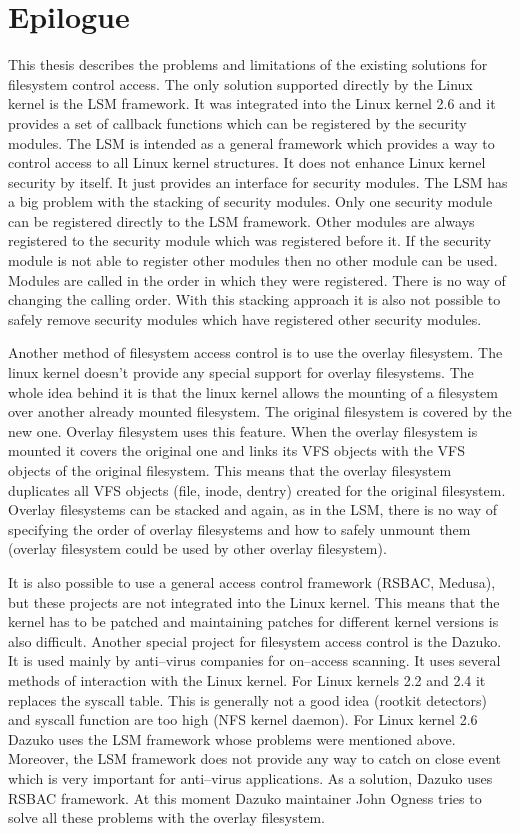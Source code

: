 \chapter{Epilogue}
This thesis describes the problems and limitations of the existing solutions for
filesystem control access. The only solution supported directly by the Linux kernel is
the LSM framework. It was integrated into the Linux kernel 2.6 and it provides a set
of callback functions which can be registered by the security modules. The LSM is intended
as a general framework which provides a way to control access to all Linux kernel
structures. It does not enhance Linux kernel security by itself. It just provides an
interface for security modules. The LSM has a big problem with the stacking of security
modules. Only one security module can be registered directly to the LSM framework.
Other modules are always registered to the security module which was registered before
it. If the security module is not able to register other modules then no other module
can be used. Modules are called in the order in which they were registered. There is
no way of changing the calling order. With this stacking approach it is also not
possible to safely remove security modules which have registered other security
modules.

Another method of filesystem access control is to use the overlay filesystem. The linux
kernel doesn't provide any special support for overlay filesystems. The whole idea
behind it is that the linux kernel allows the mounting of a filesystem over another
already mounted filesystem. The original filesystem is covered by the new one. Overlay
filesystem uses this feature. When the overlay filesystem is mounted it covers the
original one and links its VFS objects with the VFS objects of the original
filesystem. This means that the overlay filesystem duplicates all VFS objects (file,
inode, dentry) created for the original filesystem. Overlay filesystems can be stacked
and again, as in the LSM, there is no way of specifying the order of overlay
filesystems and how to safely unmount them (overlay filesystem could be used by other
overlay filesystem).

It is also possible to use a general access control framework (RSBAC, Medusa), but
these projects are not integrated into the Linux kernel. This means that the kernel has
to be patched and maintaining patches for different kernel versions is also difficult.
Another special project for filesystem access control is the Dazuko. It is used mainly
by anti--virus companies for on--access scanning. It uses several methods of interaction
with the Linux kernel. For Linux kernels 2.2 and 2.4 it replaces the syscall table.
This is generally not a good idea (rootkit detectors) and syscall function are too
high (NFS kernel daemon). For Linux kernel 2.6 Dazuko uses the LSM framework whose
problems were mentioned above. Moreover, the LSM framework does not provide any way to
catch on close event which is very important for anti--virus applications. As a
solution, Dazuko uses RSBAC framework. At this moment Dazuko maintainer John Ogness
tries to solve all these problems with the overlay filesystem.

